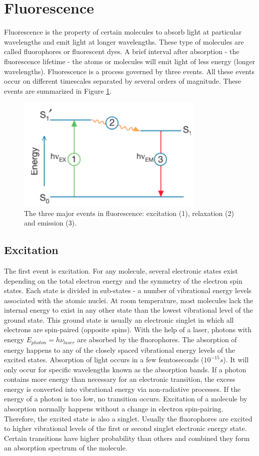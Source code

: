 \documentclass[twoside,single]{lion-msc}
\begin{document}
\section{Fluorescence}
Fluorescence is the property of certain molecules to absorb light at particular wavelengths and emit light at longer wavelengths. These type of molecules are called fluorophores or fluorescent dyes. A brief interval after absorption - the fluorescence lifetime - the atoms or molecules will emit light of less energy (longer wavelengths).  Fluorescence is a process governed by three events. All these events occur on different timescales separated by several orders of magnitude. These events are summarized in Figure \ref{fluor}.
\begin{figure}[ht!]
\centering
\includegraphics[width=90mm]{fluorescence.jpg}
\caption{The three major events in fluorescence: excitation (1), relaxation (2) and emission (3).} 
\label{fluor}
\end{figure}

\subsection{Excitation}
The first event is excitation. For any molecule, several electronic states exist depending on the total electron energy and the symmetry of the electron spin states. Each state is divided in sub-states - a number of vibrational energy levels associated with the atomic nuclei. At room temperature, most molecules lack the internal energy to exist in any other state than the lowest vibrational level of the ground state. This ground state is usually an electronic singlet in which all electrons are spin-paired (opposite spins). With the help of a laser, photons with energy $E_{photon}=h \nu_{laser}$ are absorbed by the fluorophores. The absorption of energy happens to any of the closely spaced vibrational energy levels of the excited states. Absorption of light occurs in a few femtoseconds ($10^{-15}s$). It will only occur for specific wavelengths known as the absorption bands. If a photon contains more energy than necessary for an electronic transition, the excess energy is converted into vibrational energy via non-radiative processes. If the energy of a photon is too low, no transition occurs. Excitation of a molecule by absorption normally happens without a change in electron spin-pairing. Therefore, the excited state is also a singlet. Usually the fluorophores are excited to higher vibrational levels of the first or second singlet electronic energy state. Certain transitions have higher probability than others and combined they form an absorption spectrum of the molecule.
\end{document}
